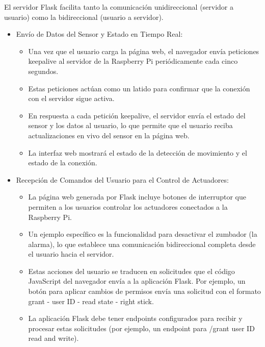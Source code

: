 \documentclass{report}
\begin{document}
El servidor Flask facilita tanto la comunicación unidireccional (servidor a usuario) como la bidireccional (usuario a servidor).
\begin{itemize}
    \item Envío de Datos del Sensor y Estado en Tiempo Real:
    \begin{itemize}
        \item Una vez que el usuario carga la página web, el navegador envía peticiones keepalive al servidor de la Raspberry Pi 
        periódicamente cada cinco segundos.
        \item Estas peticiones actúan como un latido para confirmar que la conexión con el servidor sigue activa.
        \item En respuesta a cada petición keepalive, el servidor envía el estado del sensor y los datos al usuario, lo que permite que el 
        usuario reciba actualizaciones en vivo del sensor en la página web.
        \item La interfaz web mostrará el estado de la detección de movimiento y el estado de la conexión.
    \end{itemize}

    \item Recepción de Comandos del Usuario para el Control de Actuadores:
    \begin{itemize}
        \item La página web generada por Flask incluye botones de interruptor que permiten a los usuarios controlar los actuadores 
        conectados a la Raspberry Pi.
        \item Un ejemplo específico es la funcionalidad para desactivar el zumbador (la alarma), lo que establece una comunicación bidireccional 
        completa desde el usuario hacia el servidor.
        \item Estas acciones del usuario se traducen en solicitudes que el código JavaScript del navegador envía a la aplicación Flask. 
        Por ejemplo, un botón para aplicar cambios de permisos envía una solicitud con el formato grant - user ID - read state - right stick.
        \item La aplicación Flask debe tener endpoints configurados para recibir y procesar estas solicitudes (por ejemplo, un endpoint para 
        /grant user ID read and write).
    \end{itemize}

\end{itemize}
\end{document}
